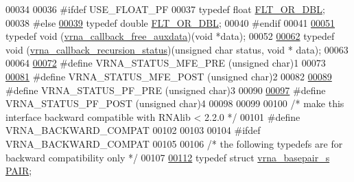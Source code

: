 \begin{DoxyCode}
00034 
00036 \textcolor{preprocessor}{#ifdef  USE\_FLOAT\_PF}
00037 \textcolor{keyword}{typedef} \textcolor{keywordtype}{float} \hyperlink{group__data__structures_ga31125aeace516926bf7f251f759b6126}{FLT\_OR\_DBL};
00038 \textcolor{preprocessor}{#else}
\hypertarget{data__structures_8h_source.tex_l00039}{}\hyperlink{group__data__structures_ga31125aeace516926bf7f251f759b6126}{00039} \textcolor{keyword}{typedef} \textcolor{keywordtype}{double}  \hyperlink{group__data__structures_ga31125aeace516926bf7f251f759b6126}{FLT\_OR\_DBL};
00040 \textcolor{preprocessor}{#endif}
00041 
\hypertarget{data__structures_8h_source.tex_l00051}{}\hyperlink{group__fold__compound_ga3ae51bfd5fc3236652d1de4e3274b49b}{00051} \textcolor{keyword}{typedef} void (\hyperlink{group__fold__compound_ga3ae51bfd5fc3236652d1de4e3274b49b}{vrna\_callback\_free\_auxdata})(\textcolor{keywordtype}{void} *data);
00052 
\hypertarget{data__structures_8h_source.tex_l00062}{}\hyperlink{group__fold__compound_ga4a4a0d838de6d18315bafc84f93f5cc0}{00062} \textcolor{keyword}{typedef} void (\hyperlink{group__fold__compound_ga4a4a0d838de6d18315bafc84f93f5cc0}{vrna\_callback\_recursion\_status})(\textcolor{keywordtype}{unsigned} \textcolor{keywordtype}{char} status, \textcolor{keywordtype}{void} *
      data);
00063 
00064 
\hypertarget{data__structures_8h_source.tex_l00072}{}\hyperlink{group__fold__compound_ga1a5053dc8acbb0111e852988726f07d6}{00072} \textcolor{preprocessor}{#define VRNA\_STATUS\_MFE\_PRE     (unsigned char)1}
00073 
\hypertarget{data__structures_8h_source.tex_l00081}{}\hyperlink{group__fold__compound_ga47c900ca76e56e59e2e83a06e0bde641}{00081} \textcolor{preprocessor}{#define VRNA\_STATUS\_MFE\_POST    (unsigned char)2}
00082 
\hypertarget{data__structures_8h_source.tex_l00089}{}\hyperlink{group__fold__compound_ga91795d35ebdb6f32be50459f24b3d114}{00089} \textcolor{preprocessor}{#define VRNA\_STATUS\_PF\_PRE      (unsigned char)3}
00090 
\hypertarget{data__structures_8h_source.tex_l00097}{}\hyperlink{group__fold__compound_ga1c6fa243533fd026e50f7d595eaaa565}{00097} \textcolor{preprocessor}{#define VRNA\_STATUS\_PF\_POST     (unsigned char)4}
00098 
00099 
00100 \textcolor{comment}{/* make this interface backward compatible with RNAlib < 2.2.0 */}
00101 \textcolor{preprocessor}{#define VRNA\_BACKWARD\_COMPAT}
00102 
00103 
00104 \textcolor{preprocessor}{#ifdef VRNA\_BACKWARD\_COMPAT}
00105 
00106 \textcolor{comment}{/* the following typedefs are for backward compatibility only */}
00107 
\hypertarget{data__structures_8h_source.tex_l00112}{}\hyperlink{group__data__structures_ga4381025ffbd692e54189b2c679c79c99}{00112} \textcolor{keyword}{typedef} \textcolor{keyword}{struct }\hyperlink{group__data__structures_structvrna__basepair__s}{vrna\_basepair\_s}  \hyperlink{group__data__structures_structvrna__basepair__s}{PAIR};

\end{DoxyCode}
